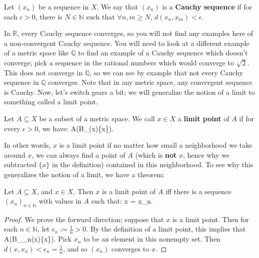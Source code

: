 	\begin{definition}
		Let $(x_n)$ be a sequence in $X$. We say that $(x_n)$ is a \textbf{Cauchy sequence} if for each $\epsilon > 0$, there is $N\in\mathbb N$ such that 
		$\forall n, m\geq N$, $d(x_n, x_m) < \epsilon$.
	\end{definition}
	
	In $\mathbb R$, every Cauchy sequence converges, so you will not find any examples here of a non-convergent Cauchy sequence. 
	You will need to look at a different example of a metric space like $\mathbb Q$ to find an example of a Cauchy sequence which doesn't converge; pick a 
	sequence in the rational numbers which would converge to $\sqrt{2}$. This does not converge in $\mathbb Q$, so we can see by example that not every 
	Cauchy sequence in $\mathbb Q$ converges. Note that in any metric space, any convergent sequence is Cauchy. Now, let's switch gears a bit; we will generalize 
	the notion of a limit to something called a limit point.
	
	\begin{definition}
		Let $A\subseteq X$ be a subset of a metric space. We call $x\in X$ a \textbf{limit point} of $A$ if for every $\epsilon > 0$, we have:
		\eq
			A\cap(B_\epsilon(x)\setminus\{x\})\neq\emptyset.
		\qe
	\end{definition}
	
	In other words, $x$ is a limit point if no matter how small a neighborhood we take around $x$, we can always find a point of $A$ (which is \textbf{not} $x$, 
	hence why we subtracted $\{x\}$ in the definition) contained in this neighborhood. To see why this generalizes the notion of a limit, we have a theorem:
	
	\begin{theorem}
		Let $A\subseteq X$, and $x\in X$. Then $x$ is a limit point of $A$ iff there is a sequence $(x_n)_{n\in\mathbb N}$ with values in $A$ such that:
		\eq
			x = \lim x_n.
		\qe
	\end{theorem}
	
	\begin{proof}
		We prove the forward direction; suppose that $x$ is a limit point. Then for each $n\in\mathbb N$, let $\epsilon_n := \frac{1}{n} > 0$. By the definition of 
		a limit point, this implies that
		\eq
			A\cap(B_{\epsilon_n}(x)\setminus\{x\})\neq\emptyset.
		\qe
		Pick $x_n$ to be an element in this nonempty set. Then $d(x, x_n) < \epsilon_n = \frac{1}{n}$, and so $(x_n)$ converges to $x$.
	\end{proof}
	
